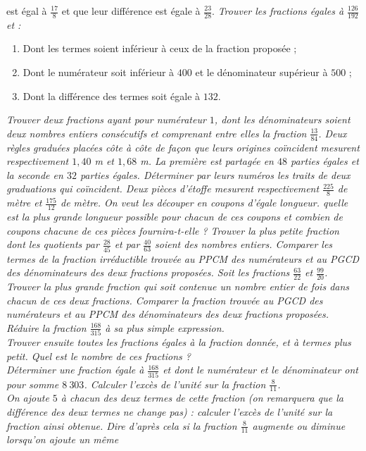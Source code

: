 \begin{itemize}
 est égal à $\frac{17}8$ et que leur différence est égale à $\frac{23}{28}$. 
 \it Trouver les fractions égales à $\frac{126}{192}$ et :\begin{enumerate}
 \item Dont les termes soient inférieur à ceux de la fraction proposée ; 
 \item Dont le numérateur soit inférieur à $400$ et le dénominateur supérieur à $500$ ; 
 \item Dont la différence des termes soit égale à $132$.
 \end{enumerate}
 \it Trouver deux fractions ayant pour numérateur $1$, dont les dénominateurs soient deux nombres entiers consécutifs et comprenant entre elles la fraction $\frac{13}{84}$. 
 \it Deux règles graduées placées côte à côte de façon que leurs origines coïncident mesurent respectivement $1,40$ m et $1,68$ m. La première est partagée en $48$ parties égales et la seconde en $32$ parties égales. Déterminer par leurs numéros les traits de deux graduations qui coïncident. 
 \it Deux pièces d'étoffe mesurent respectivement $\frac{225}8$ de mètre et $\frac{175}{12}$ de mètre. 
 On veut les découper en coupons d'égale longueur. quelle est la plus grande longueur possible pour chacun de ces coupons et combien de coupons chacune de ces pièces fournira-t-elle ? 
 \it Trouver la plus petite fraction dont les quotients par $\frac{28}{45}$ et par $\frac{40}{63}$ soient des nombres entiers. Comparer les termes de la fraction irréductible trouvée au PPCM des numérateurs et au PGCD des dénominateurs des deux fractions proposées. 
 \it Soit les fractions $\frac{63}{22}$ et $\frac{99}{20}$. Trouver la plus grande fraction qui soit contenue un nombre entier de fois dans chacun de ces deux fractions. Comparer la fraction trouvée au PGCD des numérateurs et au PPCM des dénominateurs des deux fractions proposées.
 \it Réduire la fraction $\frac{168}{315}$ à sa plus simple expression. \\ Trouver ensuite toutes les fractions égales à la fraction donnée, et à termes plus petit. Quel est le nombre de ces fractions ?\\
 Déterminer une fraction égale à $\frac{168}{315}$ et dont le numérateur et le dénominateur ont pour somme $8~303$. 
 \it Calculer l'excès de l'unité sur la fraction $\frac8{11}$. \\ On ajoute $5$ à chacun des deux termes de cette fraction (on remarquera que la différence des deux termes ne change pas) : calculer l'excès de l'unité sur la fraction ainsi obtenue. Dire d'après cela si la fraction $\frac8{11}$ augmente ou diminue lorsqu'on ajoute un même 

\end{itemize}
